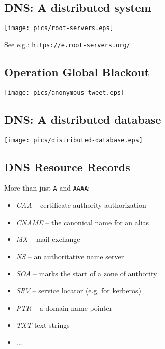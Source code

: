 \documentclass[xga]{xdvislides}
\begin{document}
\subsection{DNS: A distributed system}
\vspace*{\fill}
\begin{center}
	\texttt{[image: pics/root-servers.eps]}
\end{center}
\vspace*{\fill}
See e.g.: {\tt https://e.root-servers.org/}

\subsection{Operation Global Blackout}
\vspace*{\fill}
\begin{center}
	\texttt{[image: pics/anonymous-tweet.eps]} \\
\end{center}
\vspace*{\fill}


\subsection{DNS: A distributed database}
\vspace*{\fill}
\begin{center}
	\texttt{[image: pics/distributed-database.eps]}
\end{center}
\vspace*{\fill}


\subsection{DNS Resource Records}
More than just {\tt A} and {\tt AAAA}:
\begin{itemize}
	\item {\em CAA} -- certificate authority authorization
	\item {\em CNAME} -- the canonical name for an alias
	\item {\em MX} -- mail exchange
	\item {\em NS} -- an authoritative name server
	\item {\em SOA} -- marks the start of a zone of authority
	\item {\em SRV} -- service locator (e.g. for kerberos)
	\item {\em PTR} -- a domain name pointer
	\item {\em TXT} text strings
	\item ...
\end{itemize}
\end{document}
